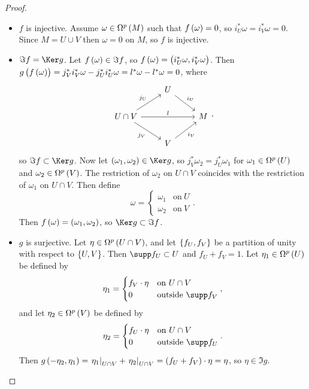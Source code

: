 \begin{proof}
\hfill
\begin{itemize}
\item $ f $ is injective. Assume $ \omega \in \Omega^p\br{M} $ such that $ f\br{\omega} = 0 $, so $ i_U^*\omega = i_V^*\omega = 0 $. Since $ M = U \cup V $ then $ \omega = 0 $ on $ M $, so $ f $ is injective.
\item $ \Im f = \Ker g $. Let $ f\br{\omega} \in \Im f $, so $ f\br{\omega} = \br{i_U^*\omega, i_V^*\omega} $. Then $ g\br{f\br{\omega}} = j_V^*i_V^*\omega - j_U^*i_U^*\omega = l^*\omega - l^*\omega = 0 $, where
$$
\begin{tikzcd}
& U \arrow{dr}{i_U} & \\
U \cap V \arrow{ur}{j_U} \arrow{rr}{l} \arrow[swap]{dr}{j_V} & & M \\
& V \arrow[swap]{ur}{i_V} &
\end{tikzcd},
$$
so $ \Im f \subset \Ker g $. Now let $ \br{\omega_1, \omega_2} \in \Ker g $, so $ j_V^*\omega_2 = j_U^*\omega_1 $ for $ \omega_1 \in \Omega^p\br{U} $ and $ \omega_2 \in \Omega^p\br{V} $. The restriction of $ \omega_2 $ on $ U \cap V $ coincides with the restriction of $ \omega_1 $ on $ U \cap V $. Then define
$$ \omega =
\begin{cases}
\omega_1 & \text{on} \ U \\
\omega_2 & \text{on} \ V
\end{cases}.
$$
Then $ f\br{\omega} = \br{\omega_1, \omega_2} $, so $ \Ker g \subset \Im f $.
\item $ g $ is surjective. Let $ \eta \in \Omega^p\br{U \cap V} $, and let $ \cbr{f_U, f_V} $ be a partition of unity with respect to $ \cbr{U, V} $. Then $ \supp f_U \subset U $ and $ f_U + f_V = 1 $. Let $ \eta_1 \in \Omega^p\br{U} $ be defined by
$$ \eta_1 =
\begin{cases}
f_V \cdot \eta & \text{on} \ U \cap V \\
0 & \text{outside} \ \supp f_V
\end{cases},
$$
and let $ \eta_2 \in \Omega^p\br{V} $ be defined by
$$ \eta_2 =
\begin{cases}
f_U \cdot \eta & \text{on} \ U \cap V \\
0 & \text{outside} \ \supp f_U
\end{cases}.
$$
Then $ g\br{-\eta_2, \eta_1} = \eval{\eta_1}_{U \cap V} + \eval{\eta_2}_{U \cap V} = \br{f_U + f_V} \cdot \eta = \eta $, so $ \eta \in \Im g $.
\end{itemize}
\end{proof}

